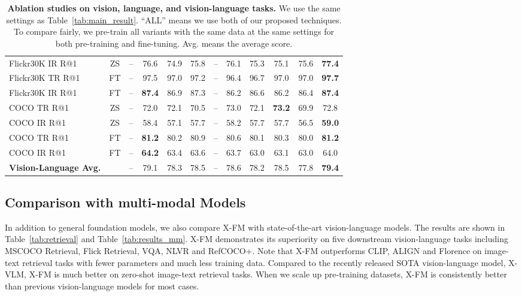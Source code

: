 \documentclass[11pt]{article}
\newcommand{\ModelName}{X-FM\xspace}
\newcommand{\ModelNameB}{X-FM\xspace}
\newcommand{\babyx}{X-VLM}
\begin{document}
\begin{table*}[t]
{\begin{tabular}{lc|c|ccc|ccc|ccc}
Flickr30K IR R@1 & ZS & -- & 76.6 & 74.9 & 75.8 & -- & 76.1 & 75.3 & 75.1 & 75.6 & {\bf 77.4} \\
Flickr30K TR R@1 & FT & -- & 97.5 & 97.0 & 97.2 & -- & 96.4 & 96.7 & 97.0 & 97.0 & {\bf 97.7} \\
Flickr30K IR R@1 & FT & -- & {\bf 87.4} & 86.9 & 87.3 & -- & 86.2 & 86.6 & 86.2 & 86.4 & {\bf 87.4} \\
COCO TR R@1 & ZS & -- & 72.0 & 72.1 & 70.5 & -- & 73.0 & 72.1 & {\bf 73.2} & 69.9 & 72.8 \\
COCO IR R@1 & ZS & -- & 58.4 & 57.1 & 57.7 & -- & 58.2 & 57.7 & 57.7 & 56.5 & {\bf 59.0} \\
COCO TR R@1 & FT & -- & {\bf 81.2} & 80.2 & 80.9 & -- & 80.6 & 80.1 & 80.3 & 80.0 & {\bf 81.2} \\
COCO IR R@1 & FT & -- & {\bf 64.2} & 63.4 & 63.6 & -- & 63.7 & 63.0 & 63.1 & 63.0 & 64.0 \\
\midrule
\textbf{Vision-Language Avg.} &  & -- & 79.1 & 78.3 & 78.5 & -- & 78.6 & 78.2 & 78.5 & 77.8 & {\bf 79.4} \\
\bottomrule
\end{tabular}}
\caption{
\textbf{Ablation studies on vision, language, and vision-language tasks.} We use the same settings as Table~\ref{tab:main_result}. ``ALL'' means we use both of our proposed techniques.
To compare fairly, we pre-train all variants with the same data at the same settings for both pre-training and fine-tuning.
Avg. means the average score.
}
\label{tab:ablation_result}
\end{table*}

\subsection{Comparison with multi-modal Models}
\label{sec:exp_mm}
In addition to general foundation models, we also compare {\ModelName} with state-of-the-art vision-language models.
The results are shown in Table~\ref{tab:retrieval} and Table~\ref{tab:results_mm}.
{\ModelName} demonstrates its superiority on five downstream vision-language tasks including MSCOCO Retrieval, Flick Retrieval, VQA, NLVR and RefCOCO+. Note that {\ModelNameB} outperforms CLIP, ALIGN and Florence on image-text retrieval tasks with fewer parameters and much less training data. Compared to the recently released SOTA vision-language model, {\babyx}, {\ModelName} is much better on zero-shot image-text retrieval tasks. When we scale up pre-training datasets, {\ModelNameB} is consistently better than previous vision-language models for most cases.
\end{document}
